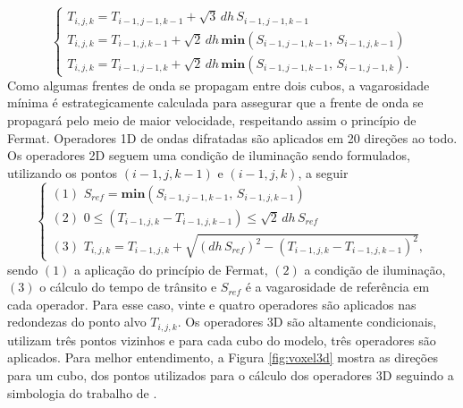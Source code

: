 \begin{equation}
	\begin{cases}
		T_{i,j,k} = T_{i-1,j-1,k-1} + \sqrt{3}\,dh\,S_{i-1,j-1,k-1} \\
		T_{i,j,k} = T_{i-1,j,k-1} + \sqrt{2}\,dh\,\mathbf{min}(S_{i-1,j-1,k-1},\,S_{i-1,j,k-1}) \\
		T_{i,j,k} = T_{i-1,j-1,k} + \sqrt{2}\,dh\,\mathbf{min}(S_{i-1,j-1,k-1},\,S_{i-1,j-1,k}).
	\end{cases}
	\label{1D_diffractions}
\end{equation}
\noindent Como algumas frentes de onda se propagam entre dois cubos, a vagarosidade mínima é estrategicamente calculada para assegurar que a frente de onda se propagará pelo meio de maior velocidade, respeitando assim o princípio de Fermat. Operadores 1D de ondas difratadas são aplicados em 20 direções ao todo. Os operadores 2D seguem uma condição de iluminação sendo formulados, utilizando os pontos $(i-1,j,k-1)$ e $(i-1,j,k)$, a seguir
\begin{equation}
	\begin{cases}
		(1) \,\, S_{ref} = \mathbf{min}(S_{i-1,j-1,k-1},\, S_{i-1,j,k-1})  \\
		(2) \,\, 0 \le (T_{i-1,j,k} - T_{i-1,j,k-1}) \le \sqrt{2}\,dh\,S_{ref} \\
		(3) \,\, T_{i,j,k} = T_{i-1,j,k} + \sqrt{(dh\,S_{ref})^2 - (T_{i-1,j,k} - T_{i-1,j,k-1})^2},	
	\end{cases}
	\label{2D_operators}
\end{equation}
\noindent sendo $(1)$ a aplicação do princípio de Fermat, $(2)$ a condição de iluminação, $(3)$ o cálculo do tempo de trânsito e $S_{ref}$ é a vagarosidade de referência em cada operador. Para esse caso, vinte e quatro operadores são aplicados nas redondezas do ponto alvo $T_{i,j,k}$. Os operadores 3D são altamente condicionais, utilizam três pontos vizinhos e para cada cubo do modelo, três operadores são aplicados. Para melhor entendimento, a Figura \ref{fig:voxel3d} mostra as direções para um cubo, dos pontos utilizados para o cálculo dos operadores 3D seguindo a simbologia do trabalho de . 

